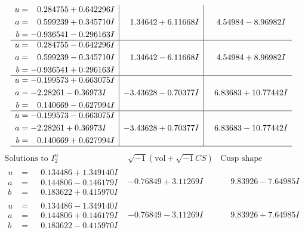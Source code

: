 \documentclass[1p]{elsarticle_modified}
\theoremstyle{definition}
\newcommand{\I}{\sqrt{-1}}
\begin{document}
$$\begin{array}{c|c|c}
\begin{aligned}
u &= \phantom{-}0.284755 + 0.642296 I \\
a &= \phantom{-}0.599239 + 0.345710 I \\
b &= -0.936541 - 0.296163 I\end{aligned}
 & \phantom{-}1.34642 + 6.11668 I & \phantom{-}4.54984 - 8.96982 I \\ \hline\begin{aligned}
u &= \phantom{-}0.284755 - 0.642296 I \\
a &= \phantom{-}0.599239 - 0.345710 I \\
b &= -0.936541 + 0.296163 I\end{aligned}
 & \phantom{-}1.34642 - 6.11668 I & \phantom{-}4.54984 + 8.96982 I \\ \hline\begin{aligned}
u &= -0.199573 + 0.663075 I \\
a &= -2.28261 - 0.36973 I \\
b &= \phantom{-}0.140669 - 0.627994 I\end{aligned}
 & -3.43628 - 0.70377 I & \phantom{-}6.83683 + 10.77442 I \\ \hline\begin{aligned}
u &= -0.199573 - 0.663075 I \\
a &= -2.28261 + 0.36973 I \\
b &= \phantom{-}0.140669 + 0.627994 I\end{aligned}
 & -3.43628 + 0.70377 I & \phantom{-}6.83683 - 10.77442 I\\
 \hline 
 \end{array}$$\newpage$$\begin{array}{c|c|c}  
\text{Solutions to }I^u_{2}& \I (\text{vol} + \sqrt{-1}CS) & \text{Cusp shape}\\
 \hline 
\begin{aligned}
u &= \phantom{-}0.134486 + 1.349140 I \\
a &= \phantom{-}0.144806 - 0.146179 I \\
b &= \phantom{-}0.183622 + 0.415970 I\end{aligned}
 & -0.76849 + 3.11269 I & \phantom{-}9.83926 - 7.64985 I \\ \hline\begin{aligned}
u &= \phantom{-}0.134486 - 1.349140 I \\
a &= \phantom{-}0.144806 + 0.146179 I \\
b &= \phantom{-}0.183622 - 0.415970 I\end{aligned}
 & -0.76849 - 3.11269 I & \phantom{-}9.83926 + 7.64985 I \\ \hline\begin{aligned}

\end{aligned}
\end{array}$$
\end{document}
